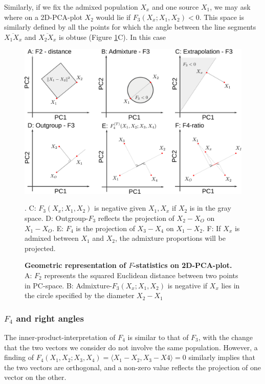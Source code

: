 \documentclass[12pt,a4pape, fullpage]{article}
\begin{document}
Similarly, if we fix the admixed population $X_x$ and one source $X_1$, we may ask where on a 2D-PCA-plot $X_2$ would lie if $F_3(X_x; X_1, X_2) < 0$. This space is similarly defined by all the points for which the angle between the line segments $\overline{X_1X_x}$ and $\overline{X_2 X_x}$ is obtuse (Figure \ref{fig:fstats_theory}C). In this case

\begin{figure}[!ht]
	\includegraphics[width=\textwidth]{dummy_pca.png}
	\caption{\textbf{Geometric representation of $F$-statistics on 2D-PCA-plot.} A: $F_2$ represents the squared Euclidean distance between two points in PC-space. B: Admixture-$F_3(X_x; X_1, X_2)$ is negative if $X_x$ lies in the circle specified by the diameter $X_2-X_1$}. C: $F_3(X_x; X_1, X_2)$ is negative given $X_1, X_x$ if $X_2$ is in the gray space.  D: Outgroup-$F_3$ reflects the projection of $X_2 - X_O$ on $X_1 - X_O$. E: $F_4$ is the projection of $X_3 - X_4$ on $X_1-X_2$. F: If $X_x$ is admixed between $X_1$ and $X_2$, the admixture proportions will be projected.
	\label{fig:fstats_theory}
\end{figure}

\subsubsection{$F_4$ and right angles}
The inner-product-interpretation of $F_4$ is similar to that of $F_3$, with the change that the two vectors we consider do not involve the same population. However, a finding of $F_4(X_1, X_2; X_3, X_4) = \langle X_1 - X_2, X_3 - X4 \rangle = 0$ similarly implies that the two vectors are orthogonal, and a non-zero value reflects the projection of one vector on the other.
\end{document}

